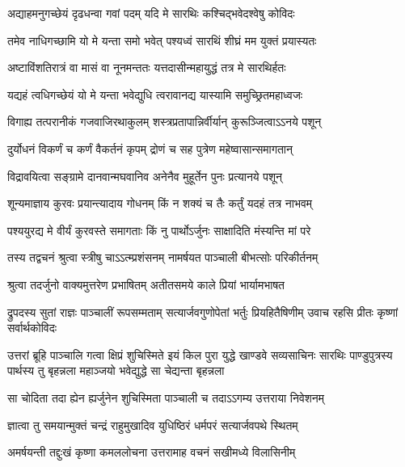 \twolineshloka
{अद्याहमनुगच्छेयं दृढधन्वा गवां पदम्}
{यदि मे सारथिः कश्चिद्भवेदश्वेषु कोविदः}


\twolineshloka
{तमेव नाधिगच्छामि यो मे यन्ता समो भवेत्}
{पश्यध्वं सारथिं शीघ्रं मम युक्तं प्रयास्यतः}


\twolineshloka
{अष्टाविंशतिरात्रं वा मासं वा नूनमन्ततः}
{यत्तदासीन्महायुद्धं तत्र मे सारथिर्हतः}


\twolineshloka
{यद्यहं त्वधिगच्छेयं यो मे यन्ता भवेद्युधि}
{त्वरावानद्य यास्यामि समुच्छ्रितमहाध्वजः}


\twolineshloka
{विगाह्य तत्परानीकं गजवाजिरथाकुलम्}
{शस्त्रप्रतापान्निर्वीर्यान् कुरूञ्जित्वाऽऽनये पशून्}


\twolineshloka
{दुर्योधनं विकर्णं च कर्णं वैकर्तनं कृपम्}
{द्रोणं च सह पुत्रेण महेष्वासान्समागतान्}


\twolineshloka
{विद्रावयित्वा सङ्ग्रामे दानवान्मघवानिव}
{अनेनैव मुहूर्तेन पुनः प्रत्यानये पशून्}


\twolineshloka
{शून्यमाज्ञाय कुरवः प्रयान्त्यादाय गोधनम्}
{किं न शक्यं च तैः कर्तुं यदहं तत्र नाभवम्}


\twolineshloka
{पश्ययुरद्य मे वीर्यं कुरवस्ते समागताः}
{किं नु पार्थोऽर्जुनः साक्षादिति मंस्यन्ति मां परे}




\twolineshloka
{तस्य तद्वचनं श्रुत्वा स्त्रीषु चाऽऽत्म्प्रशंसनम्}
{नामर्षयत पाञ्चाली बीभत्सोः परिकीर्तनम्}


\twolineshloka
{श्रुत्वा तदर्जुनो वाक्यमुत्तरेण प्रभाषितम्}
{अतीतसमये काले प्रियां भार्यामभाषत}


\threelineshloka
{द्रुपदस्य सुतां राज्ञः पाञ्चालीं रूपसम्मताम्}
{सत्यार्जवगुणोपेतां भर्तुः प्रियहितैषिणीम्}
{उवाच रहसि प्रीतः कृष्णां सर्वार्थकोविदः}


\onelineshloka
{उत्तरां ब्रूहि पाञ्चालि गत्वा क्षिप्रं शुचिस्मिते}
\threelineshloka
{इयं किल पुरा युद्धे खाण्डवे सव्यसाचिनः}
{सारथिः पाण्डुपुत्रस्य पार्थस्य तु बृहन्नला}
{महाञ्जयो भवेद्युद्धे सा चेद्यन्ता बृहन्नला}



\twolineshloka
{सा चोदिता तदा ह्येन ह्यर्जुनेन शुचिस्मिता}
{पाञ्चाली च तदाऽऽगम्य उत्तराया निवेशनम्}


\twolineshloka
{ज्ञात्वा तु समयान्मुक्तं चन्द्रं राहुमुखादिव}
{युधिष्ठिरं धर्मपरं सत्यार्जवपथे स्थितम्}


\twolineshloka
{अमर्षयन्ती तद्दुःखं कृष्णा कमललोचना}
{उत्तरामाह वचनं सखीमध्ये विलासिनीम्}


